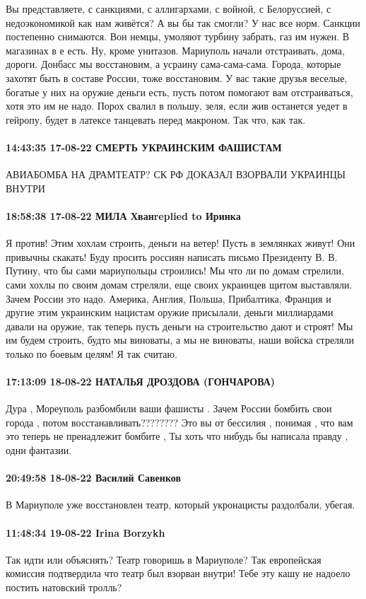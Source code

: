 Вы представляете, с санкциями, с аллигархами, с войной, с Белоруссией, с
недоэкономикой как нам живётся? А вы бы так смогли? У нас все норм. Санкции
постепенно снимаются. Вон немцы, умоляют турбину забрать, газ им нужен. В
магазинах в е есть. Ну, кроме унитазов. Мариуполь начали отстраивать, дома,
дороги. Донбасс мы восстановим, а усраину сама-сама-сама. Города, которые
захотят быть в составе России, тоже восстановим. У вас такие друзья веселые,
богатые у них на оружие деньги есть, пусть потом помогают вам отстраиваться,
хотя это им не надо. Порох свалил в польшу, зеля, если жив останется уедет в
гейропу, будет в латексе танцевать перед макроном. Так что, как так.

\paragraph{14:43:35 17-08-22 СМЕРТЬ УКРАИНСКИМ ФАШИСТАМ}

АВИАБОМБА НА ДРАМТЕАТР? СК РФ ДОКАЗАЛ ВЗОРВАЛИ УКРАИНЦЫ ВНУТРИ

\paragraph{18:58:38 17-08-22 МИЛА Хванreplied to Иринка}

Я против! Этим хохлам строить, деньги на ветер! Пусть в землянках живут! Они
привычны скакать! Буду просить россиян написать письмо Президенту В. В. Путину,
что бы сами мариупольцы строились! Мы что ли по домам стрелили, сами хохлы по
своим домам стреляли, еще своих украинцев щитом выставляли. Зачем России это
надо. Америка, Англия, Польша, Прибалтика, Франция и другие этим украинским
нацистам оружие присылали, деньги миллиардами давали на оружие, так теперь
пусть деньги на строительство дают и строят! Мы им будем строить, будто мы
виноваты, а мы не виноваты, наши войска стреляли только по боевым целям! Я так
считаю.

\paragraph{17:13:09 18-08-22 НАТАЛЬЯ ДРОЗДОВА (ГОНЧАРОВА)}

Дура , Мореуполь разбомбили ваши фашисты .
Зачем России бомбить свои города , потом восстанавливать????????
Это вы от бессилия , понимая , что вам это теперь не пренадлежит бомбите ,
Ты хоть что нибудь бы написала правду , одни фантазии.

\paragraph{20:49:58 18-08-22 Василий Савенков}

В Мариуполе уже восстановлен театр, который укронацисты раздолбали, убегая.

\paragraph{11:48:34 19-08-22 Irina Borzykh}

Так идти или объяснять? Театр говоришь в Мариуполе? Так европейская комиссия
подтвердила что театр был взорван внутри! Тебе эту кашу не надоело постить
натовский тролль?

